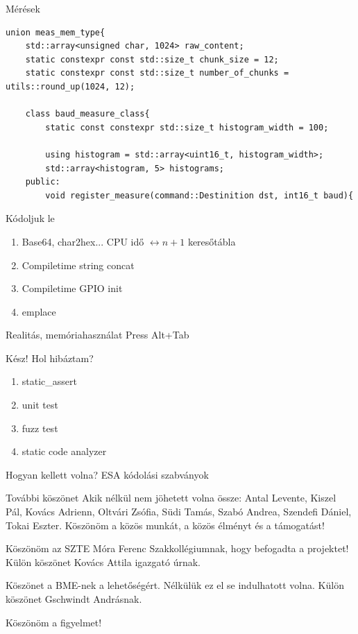 \documentclass[aspectratio=169,xcolor=dvipsnames]{beamer}
\begin{document}
\begin{frame}[fragile]{Mérések}
\begin{lstlisting}
union meas_mem_type{
    std::array<unsigned char, 1024> raw_content;
    static constexpr const std::size_t chunk_size = 12;
    static constexpr const std::size_t number_of_chunks = utils::round_up(1024, 12);

    class baud_measure_class{
        static const constexpr std::size_t histogram_width = 100;

        using histogram = std::array<uint16_t, histogram_width>;
        std::array<histogram, 5> histograms;
    public:
        void register_measure(command::Destinition dst, int16_t baud){
\end{lstlisting}
\end{frame}

\begin{frame}{Kódoljuk le}
	\begin{enumerate}
		\item Base64, char2hex... CPU idő $\leftrightarrow n+1$ keresőtábla
		\pause
		\item Compiletime string concat
		\item Compiletime GPIO init
		\item emplace
	\end{enumerate}
\end{frame}

\begin{frame}{Realitás, memóriahasználat}
Press Alt+Tab
\end{frame}

\begin{frame}{Kész! Hol hibáztam?}
	\begin{enumerate}
		\item static\_assert
		\item unit test
		\item fuzz test
		\item static code analyzer
	\end{enumerate}
\end{frame}

\begin{frame}{Hogyan kellett volna?}
	ESA kódolási szabványok
\end{frame}




\begin{frame}{További köszönet}
	Akik nélkül nem jöhetett volna össze: Antal Levente, Kiszel Pál, Kovács Adrienn, Oltvári Zsófia, Südi Tamás, Szabó Andrea, Szendefi Dániel, Tokai Eszter.
	Köszönöm a közös munkát, a közös élményt és a támogatást!
	\vspace{1cm}
	\par Köszönöm az SZTE Móra Ferenc Szakkollégiumnak, hogy befogadta a projektet! Külön köszönet Kovács Attila igazgató úrnak.
	\vspace{1cm} \par Köszönet a BME-nek a lehetőségért. Nélkülük ez el se indulhatott volna. Külön köszönet Gschwindt Andrásnak.
\end{frame}

\begin{frame}
    \Huge{\centerline{Köszönöm a figyelmet!}}
\end{frame}
\end{document}
